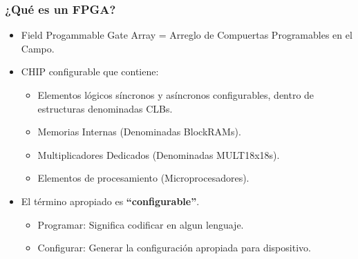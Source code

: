 \frame
{
  \frametitle{¿Qué es un FPGA?} %
  \begin{itemize}
  \item Field Progammable Gate Array = Arreglo de Compuertas Programables en el Campo. %
  \item CHIP configurable que contiene: %
  \begin{itemize}
  	\item Elementos l\'ogicos s\'incronos y as\'incronos configurables, dentro de estructuras denominadas CLBs. %
  	\item Memorias Internas (Denominadas BlockRAMs). %
  	\item Multiplicadores Dedicados (Denominadas MULT18x18s). %
  	\item Elementos de procesamiento (Microprocesadores). %
  \end{itemize}  
  \item El t\'ermino apropiado es \textbf{``configurable''}. %
  \begin{itemize}
  	\item Programar: Significa codificar en algun lenguaje. %
  	\item Configurar: Generar la configuraci\'on apropiada para dispositivo. %
  \end{itemize}  
  \end{itemize}
}

